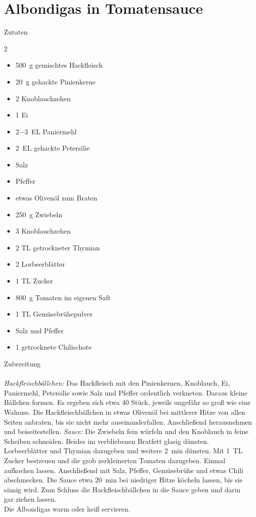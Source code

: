 \section*{Albondigas in Tomatensauce}
\ihead{}\ohead{}
\cfoot{}

{\Large Zutaten}
\begin{multicols}{2}
\begin{itemize}
    \item \SI{500}{g} gemischtes Hackfleisch
    \item \SI{20}{g} gehackte Pinienkerne
    \item \num{2} Knoblauchzehen
    \item \num{1} Ei
    \item \SI{2-3}{EL} Paniermehl
    \item \SI{2}{EL} gehackte Petersilie
    \item Salz
    \item Pfeffer
    \item etwas Olivenöl zum Braten
    \item \SI{250}{g} Zwiebeln
    \item \num{3} Knoblauchzehen
    \item \num{2} TL getrockneter Thymian
    \item \num{2} Lorbeerblätter
    \item \num{1} TL Zucker
    \item \SI{800}{g} Tomaten im eigenen Saft
    \item \num{1} TL Gemüsebrühepulver
    \item Salz und Pfeffer
    \item \num{1} getrocknete Chilischote
\end{itemize}
\end{multicols}

\noindent
{\Large Zubereitung}\\
\\
\textit{Hackfleischbällchen:} Das Hackfleisch mit den Pinienkernen, Knoblauch, Ei, Paniermehl, Petersilie sowie Salz und Pfeffer ordentlich verkneten. 
Daraus kleine Bällchen formen. Es ergeben sich etwa 40 Stück, jeweils ungefähr so groß wie eine Walnuss.
Die Hackfleischbällchen in etwas Olivenöl bei mittlerer Hitze von allen Seiten anbraten, bis sie nicht mehr auseinanderfallen. 
Anschließend herausnehmen und beiseitestellen.
\textit{Sauce:} Die Zwiebeln fein würfeln und den Knoblauch in feine Scheiben schneiden. Beides im verbliebenen Bratfett glasig dünsten. 
Lorbeerblätter und Thymian dazugeben und weitere \SI{2}{min} dünsten.
Mit \SI{1}{TL} Zucker bestreuen und die grob zerkleinerten Tomaten dazugeben. 
Einmal aufkochen lassen. 
Anschließend mit Salz, Pfeffer, Gemüsebrühe und etwas Chili abschmecken.
Die Sauce etwa \SI{20}{min} bei niedriger Hitze köcheln lassen, bis sie sämig wird.
Zum Schluss die Hackfleischbällchen in die Sauce geben und darin gar ziehen lassen.\\
Die Albondigas warm oder heiß servieren.
